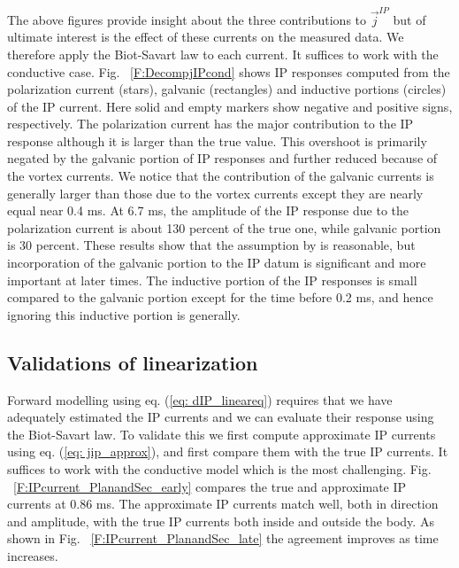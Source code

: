 \documentclass[extra,mreferee]{gji}
\renewcommand {\j}  { {\vec j} }
\begin{document}
The above figures provide insight about the three contributions to $\j^{IP}$ but of ultimate interest is the effect of these currents on the measured data. 
We therefore apply the Biot-Savart law to each current. It suffices to work with the conductive case. 
Fig. ~\ref{F:DecompjIPcond} shows IP responses computed from the polarization current (stars), galvanic (rectangles) and inductive portions (circles) of the IP current. Here solid and empty markers show negative and positive signs, respectively. 
The polarization current has the major contribution to the IP response although it is larger than the true value. This overshoot is primarily negated by the galvanic portion of IP responses and further reduced because of the vortex currents. We notice that the contribution of the galvanic currents is generally larger than those due to the vortex currents except they are nearly equal near 0.4 ms. 
At 6.7 ms, the amplitude of the  IP response due to the polarization current is about 130 percent of the true one, while galvanic portion is 30 percent. 
These results show that the assumption by \cite{Smith1988a} is reasonable, but incorporation of the galvanic portion to the IP datum is significant and more important at later times. 
The inductive portion of the IP responses  is small  compared to the galvanic portion except for the time before 0.2 ms, and hence ignoring this inductive portion is generally. 

\subsection{Validations of linearization}
Forward modelling using eq. (\ref{eq: dIP_lineareq}) requires that we have adequately estimated the IP currents and we can evaluate their response using the Biot-Savart law. To validate this we first compute approximate IP currents using eq. (\ref{eq: jip_approx}), and first compare them with the true IP currents. It suffices to work with the conductive model which is the most challenging. Fig. ~\ref{F:IPcurrent_PlanandSec_early} compares the true and approximate IP currents at 0.86 ms. The approximate IP currents match well, both in direction and amplitude, with the true IP currents both inside and outside the body. As shown in Fig. ~\ref{F:IPcurrent_PlanandSec_late} the agreement improves as time increases.
\end{document}
